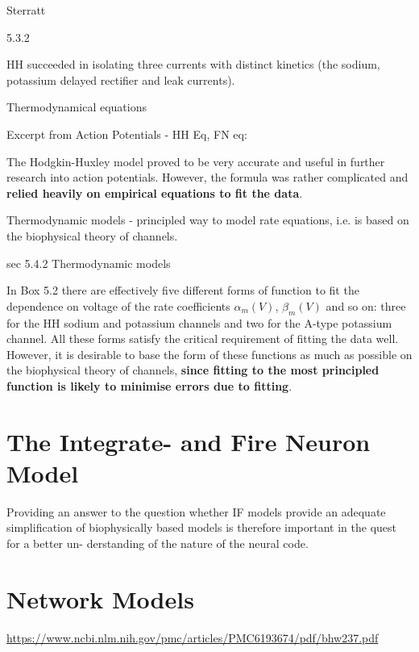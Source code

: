 Sterratt 

5.3.2 

HH succeeded in isolating three currents with distinct kinetics (the sodium, potassium delayed rectifier and leak currents).


Thermodynamical equations 

Excerpt from Action Potentials - HH Eq, FN eq:

The Hodgkin-Huxley model proved to be very accurate and useful in further research into action potentials. However, the formula was rather complicated and \textbf{relied heavily on empirical equations to fit the data}. 

Thermodynamic models - principled way to model rate equations, i.e. is based on the biophysical theory of channels. 

sec 5.4.2 Thermodynamic models

In Box 5.2 there are effectively five different forms of function to fit the dependence on voltage of the rate coefficients $\alpha_m (V)$, $\beta_m (V)$ and so on: three for the HH sodium and potassium channels and two for the A-type potassium channel. All these forms satisfy the critical requirement of fitting the data well. However, it is desirable to base the form of these functions as much as possible on the biophysical theory of channels, \textbf{since fitting to the most principled function is likely to minimise errors due to fitting}.

\section{The Integrate- and Fire Neuron Model}

Providing an answer to the question whether IF models provide an adequate simplification of biophysically based models is therefore important in the quest for a better un- derstanding of the nature of the neural code.

\section{Network Models}

\url{https://www.ncbi.nlm.nih.gov/pmc/articles/PMC6193674/pdf/bhw237.pdf}

